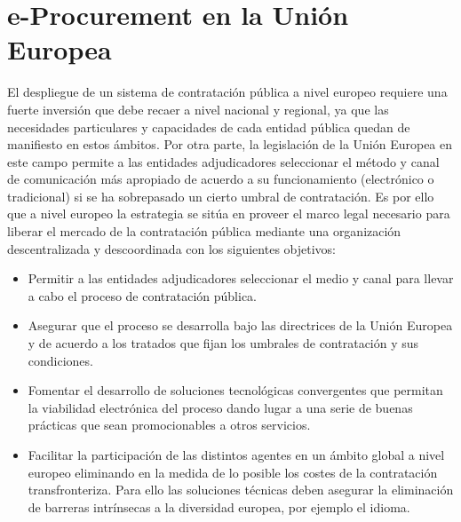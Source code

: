 \section{e-Procurement en la Unión Europea}\label{e-proc-eu}
El despliegue de un sistema de contratación pública a nivel europeo requiere
una fuerte inversión que debe recaer a nivel nacional y regional, ya que las necesidades
particulares y capacidades de cada entidad pública quedan de manifiesto en estos ámbitos.
Por otra parte, la legislación de la Unión \gls{Europea} en este campo permite a las entidades
adjudicadores seleccionar el método y canal de comunicación más apropiado de acuerdo
a su funcionamiento (electrónico o tradicional) si se ha sobrepasado un cierto umbral
de contratación. Es por ello que a nivel europeo la estrategia se sitúa en proveer
el marco legal necesario para liberar el mercado de la contratación pública mediante
una organización descentralizada y descoordinada con los siguientes objetivos:
\begin{itemize}
 \item Permitir a las entidades adjudicadores seleccionar el medio y canal para llevar
a cabo el proceso de contratación pública.
\item Asegurar que el proceso se desarrolla bajo las directrices de la Unión Europea
y de acuerdo a los tratados que fijan los umbrales de contratación y sus condiciones.
\item Fomentar el desarrollo de soluciones tecnológicas convergentes que permitan
la viabilidad electrónica del proceso dando lugar a una serie de buenas prácticas
que sean promocionables a otros servicios.
\item Facilitar la participación de las distintos agentes en un ámbito global a nivel
europeo eliminando en la medida de lo posible los costes de la contratación transfronteriza. Para ello
las soluciones técnicas deben asegurar la eliminación de barreras intrínsecas a la diversidad
europea, por ejemplo el idioma.
\end{itemize}

